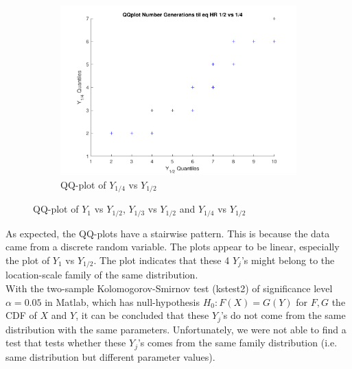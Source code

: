 \begin{figure}[H]
\begin{subfigure}{0.45\textwidth}
    \includegraphics[width=\textwidth]{QQplotATGEN2-klein.pdf}
    \caption{QQ-plot of $Y_{1/4}$ vs $Y_{1/2}$}
        \label{fig:QQplotATGEN2}
    \end{subfigure}
    \caption{QQ-plot of $Y_{1}$ vs $Y_{1/2}$, $Y_{1/3}$ vs $Y_{1/2}$ and $Y_{1/4}$ vs $Y_{1/2}$}
    \label{fig:QQ-plot}
\end{figure}

As expected, the QQ-plots have a stairwise pattern. 
This is because the data came from a discrete random variable. 
The plots appear to be linear, especially the plot of $Y_{1}$ vs $Y_{1/2}$. 
The plot indicates that these 4 $Y_j$'s might belong to the location-scale family of the same distribution.\\

With the two-sample Kolomogorov-Smirnov test (kstest2) of significance level $\alpha=0.05$ in Matlab, which has null-hypothesis $H_0:F(X)=G(Y)$ for $F,G$ the CDF of $X$ and $Y$, it can be concluded that these $Y_j$'s do not come from the same distribution with the same parameters. 
Unfortunately, we were not able to find a test that tests whether these $Y_j$'s comes from the same family distribution (i.e. same distribution but different parameter values).\\




